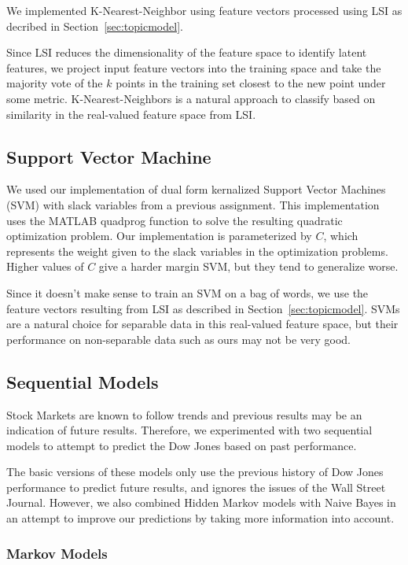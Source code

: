 \documentclass[10pt, twocolumn]{article}
\begin{document}
We implemented K-Nearest-Neighbor using feature vectors processed using LSI as decribed in Section~\ref{sec:topicmodel}.

Since LSI reduces the dimensionality of the feature space to identify latent features, we project input feature vectors into the training space and take the majority vote of the $k$ points in the training set closest to the new point under some metric. K-Nearest-Neighbors is a natural approach to classify based on similarity in the real-valued feature space from LSI.

\subsection{Support Vector Machine}
\label{sec:svm}

We used our implementation of dual form kernalized Support Vector Machines (SVM) with slack variables from a previous assignment.
This implementation uses the MATLAB quadprog function to solve the resulting quadratic optimization problem.
Our implementation is parameterized by $C$, which represents the weight given to the slack variables in the optimization problems. Higher values of $C$ give a harder margin SVM, but they tend to generalize worse. 

Since it doesn't make sense to train an SVM on a bag of words, we use the feature vectors resulting from LSI as described in Section~\ref{sec:topicmodel}. SVMs are a natural choice for separable data in this real-valued feature space, but their performance on non-separable data such as ours may not be very good.

\subsection{Sequential Models}
\label{sec:sequential-models}

Stock Markets are known to follow trends and previous results may be an indication of future results.
Therefore, we experimented with two sequential models to attempt to predict the Dow Jones based on past performance.

The basic versions of these models only use the previous history of Dow Jones performance to predict future results, and ignores the issues of the Wall Street Journal.
However, we also combined Hidden Markov models with Naive Bayes in an attempt to improve our predictions by taking more information into account.

\subsubsection{Markov Models}
\label{sec:mm}
\end{document}
